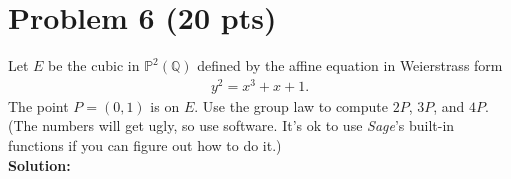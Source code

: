 \documentclass[12pt]{article}
\begin{document}
\section*{Problem 6 \small{(20 pts)}}

Let $E$ be the cubic in $\mathbb{P}^2(\mathbb{Q})$ defined by the affine equation in Weierstrass form
\begin{align*}
y^2 = x^3 + x + 1.
\end{align*}
The point $P = (0,1)$ is on $E$. Use the group law to compute $2P$, $3P$, and $4P$. (The numbers will get ugly, so use software. It's ok to use \textit{Sage}'s built-in functions if you can figure out how to do it.)\\





\noindent \textbf{Solution:} \\
\end{document}
